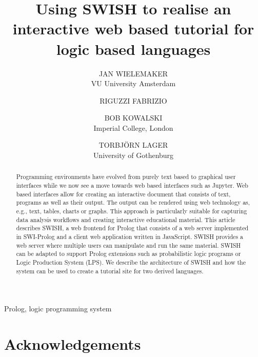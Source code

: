 \documentclass{tlp}
\begin{document}


\title{Using SWISH to realise an interactive web based
       tutorial for logic based languages}

\author[J. Wielemaker et al.]
{JAN WIELEMAKER \\
VU University Amsterdam\\
\and
RIGUZZI FABRIZIO \\
\and
BOB KOWALSKI \\
Imperial College, London\\
\and
TORBJ\"ORN LAGER \\
University of Gothenburg\\
}

\pagerange{\pageref{firstpage}--\pageref{lastpage}}
\setcounter{page}{1}

\maketitle
\begin{abstract}
Programming environments have evolved from purely text based to
graphical user interfaces while we now see a move towards web based
interfaces such as Jupyter. Web based interfaces allow for creating an
interactive document that consists of text, programs as well as their
output. The output can be rendered using web technology as, e.g., text,
tables, charts or graphs. This approach is particularly suitable for
capturing data analysis workflows and creating interactive educational
material. This article describes SWISH, a web frontend for Prolog that
consists of a web server implemented in SWI-Prolog and a client web
application written in JavaScript. SWISH provides a web server where
multiple users can manipulate and run the same material. SWISH can be
adapted to support Prolog extensions such as probabilistic logic
programs or Logic Production System (LPS). We describe the architecture
of SWISH and how the system can be used to create a tutorial site for
two derived languages.
\end{abstract}


\begin{keywords}
Prolog, logic programming system
\end{keywords}



\section*{Acknowledgements}


\end{document}
